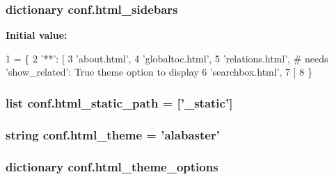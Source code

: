 \hypertarget{namespaceconf_a3f3b198d720ed6fab15e95fa2479adb6}{
\subsubsection[{html\-\_\-sidebars}]{\setlength{\rightskip}{0pt plus 5cm}dictionary conf.\-html\-\_\-sidebars}}\label{namespaceconf_a3f3b198d720ed6fab15e95fa2479adb6}
{\bfseries Initial value\-:}
\begin{DoxyCode}
1 = \{
2     \textcolor{stringliteral}{'**'}: [
3         \textcolor{stringliteral}{'about.html'},
4         \textcolor{stringliteral}{'globaltoc.html'},
5         \textcolor{stringliteral}{'relations.html'},  \textcolor{comment}{# needs 'show\_related': True theme option to display}
6         \textcolor{stringliteral}{'searchbox.html'},
7     ]
8 \}
\end{DoxyCode}
\hypertarget{namespaceconf_af4fb5d8851ccaade135c2668dd3ced41}{
\subsubsection[{html\-\_\-static\-\_\-path}]{\setlength{\rightskip}{0pt plus 5cm}list conf.\-html\-\_\-static\-\_\-path = \mbox{[}'\-\_\-static'\mbox{]}}}\label{namespaceconf_af4fb5d8851ccaade135c2668dd3ced41}
\hypertarget{namespaceconf_a6c3bfcc1a44546c1c75ce20f55bd0fd6}{
\subsubsection[{html\-\_\-theme}]{\setlength{\rightskip}{0pt plus 5cm}string conf.\-html\-\_\-theme = 'alabaster'}}\label{namespaceconf_a6c3bfcc1a44546c1c75ce20f55bd0fd6}
\hypertarget{namespaceconf_aeaafa42217d24810edc9b116b88a4585}{
\subsubsection[{html\-\_\-theme\-\_\-options}]{\setlength{\rightskip}{0pt plus 5cm}dictionary conf.\-html\-\_\-theme\-\_\-options}}\label{namespaceconf_aeaafa42217d24810edc9b116b88a4585}
